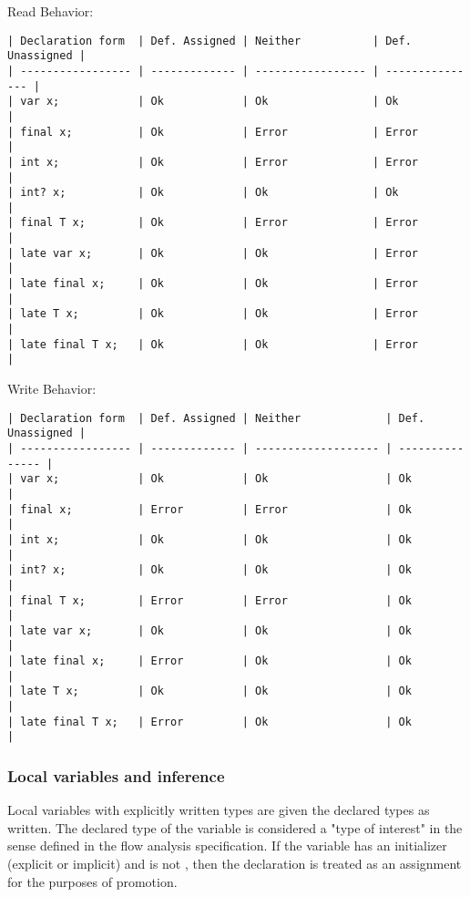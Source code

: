 \documentclass[makeidx]{article}
\begin{document}
{Read Behavior:

\begin{verbatim}
| Declaration form  | Def. Assigned | Neither           | Def. Unassigned |
| ----------------- | ------------- | ----------------- | --------------- |
| var x;            | Ok            | Ok                | Ok              |
| final x;          | Ok            | Error             | Error           |
| int x;            | Ok            | Error             | Error           |
| int? x;           | Ok            | Ok                | Ok              |
| final T x;        | Ok            | Error             | Error           |
| late var x;       | Ok            | Ok                | Error           |
| late final x;     | Ok            | Ok                | Error           |
| late T x;         | Ok            | Ok                | Error           |
| late final T x;   | Ok            | Ok                | Error           |
\end{verbatim}

Write Behavior:

\begin{verbatim}
| Declaration form  | Def. Assigned | Neither             | Def. Unassigned |
| ----------------- | ------------- | ------------------- | --------------- |
| var x;            | Ok            | Ok                  | Ok              |
| final x;          | Error         | Error               | Ok              |
| int x;            | Ok            | Ok                  | Ok              |
| int? x;           | Ok            | Ok                  | Ok              |
| final T x;        | Error         | Error               | Ok              |
| late var x;       | Ok            | Ok                  | Ok              |
| late final x;     | Error         | Ok                  | Ok              |
| late T x;         | Ok            | Ok                  | Ok              |
| late final T x;   | Error         | Ok                  | Ok              |
\end{verbatim}

\subsubsection{Local variables and inference}

Local variables with explicitly written types are given the declared types as
written.  The declared type of the variable is considered a "type of interest"
in the sense defined in the flow analysis specification.  If the variable has an
initializer (explicit or implicit) and is not \FINAL, then the declaration is
treated as an assignment for the purposes of promotion.

}
\end{document}
